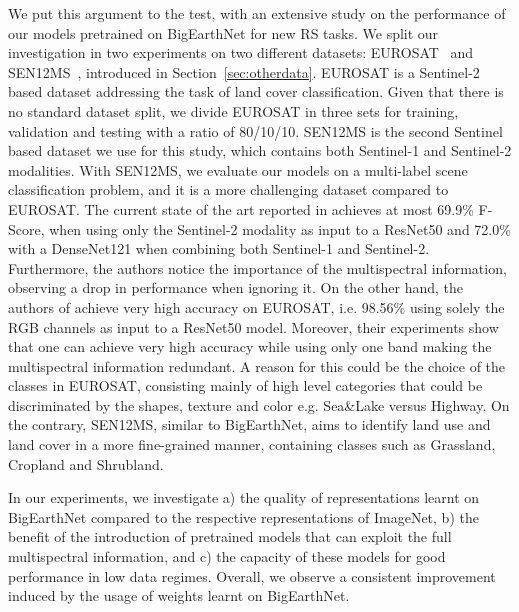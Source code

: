 \documentclass[journal]{IEEEtran}
\begin{document}
We put this argument to the test, with an extensive study on the performance of our models pretrained on BigEarthNet for new RS tasks. We split our investigation in two experiments on two different datasets: EUROSAT~\citep{helber2019eurosat} and SEN12MS~\citep{Schmitt2021}, introduced in Section~\ref{sec:otherdata}. EUROSAT is a Sentinel-2 based dataset addressing the task of land cover classification. 
Given that there is no standard dataset split, we divide EUROSAT in three sets for training, validation and testing with a ratio of 80/10/10. SEN12MS is the second Sentinel based dataset we use for this study, which contains both Sentinel-1 and Sentinel-2 modalities.
With SEN12MS, we evaluate our models on a multi-label scene classification problem, and it is a more challenging dataset compared to EUROSAT. The current state of the art reported in \citep{Schmitt2021} achieves at most 69.9\% F-Score, when using only the Sentinel-2 modality as input to a ResNet50 and 72.0\% with a DenseNet121 when combining both Sentinel-1 and Sentinel-2. Furthermore, the authors notice the importance of the multispectral information, observing a drop in performance when ignoring it. On the other hand, the authors of \citep{helber2019eurosat} achieve very high accuracy on EUROSAT, i.e. 98.56\% using solely the RGB channels as input to a ResNet50 model.
Moreover, their experiments show that one can achieve very high accuracy  while using only one band making the multispectral information redundant. A reason for this could be the choice of the classes in EUROSAT, consisting mainly of high level categories that could be discriminated by the shapes, texture and color e.g. Sea\&Lake versus Highway. On the contrary, SEN12MS, similar to BigEarthNet, aims to identify land use and land cover in a more fine-grained manner, containing classes such as Grassland, Cropland and Shrubland.


In our experiments, we investigate a) the quality of representations learnt on BigEarthNet compared to the respective representations of ImageNet, b) the benefit of the introduction of pretrained models that can exploit the full multispectral information, and c) the capacity of these models for good performance in low data regimes. Overall, we observe a consistent improvement induced by the usage of weights learnt on BigEarthNet.
\end{document}

